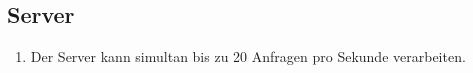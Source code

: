 \subsection{Server}

\begin{enumerate}
    \item Der Server kann simultan bis zu 20 Anfragen pro Sekunde verarbeiten.
\end{enumerate}
